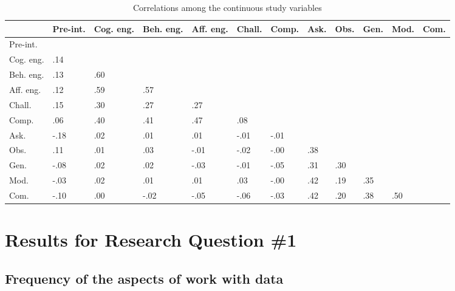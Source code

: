 \documentclass[]{msu-thesis}
\theoremstyle{definition}
\theoremstyle{definition}
\theoremstyle{definition}
\theoremstyle{remark}
\begin{document}
\begin{landscape}\begin{table}

\caption{\label{tab:unnamed-chunk-8}Correlations among the continuous study variables}
\centering
\begin{tabular}[t]{l>{\raggedright\arraybackslash}p{3em}>{\raggedright\arraybackslash}p{3em}>{\raggedright\arraybackslash}p{3em}>{\raggedright\arraybackslash}p{3em}>{\raggedright\arraybackslash}p{3em}>{\raggedright\arraybackslash}p{3em}>{\raggedright\arraybackslash}p{3em}>{\raggedright\arraybackslash}p{3em}>{\raggedright\arraybackslash}p{3em}>{\raggedright\arraybackslash}p{3em}>{\raggedright\arraybackslash}p{3em}}
\toprule
 & Pre-int. & Cog. eng. & Beh. eng. & Aff. eng. & Chall. & Comp. & Ask. & Obs. & Gen. & Mod. & Com.\\
\midrule
Pre-int. &  &  &  &  &  &  &  &  &  &  & \\
Cog. eng. & .14 &  &  &  &  &  &  &  &  &  & \\
Beh. eng. & .13 & .60 &  &  &  &  &  &  &  &  & \\
Aff. eng. & .12 & .59 & .57 &  &  &  &  &  &  &  & \\
Chall. & .15 & .30 & .27 & .27 &  &  &  &  &  &  & \\
Comp. & .06 & .40 & .41 & .47 & .08 &  &  &  &  &  & \\
Ask. & -.18 & .02 & .01 & .01 & -.01 & -.01 &  &  &  &  & \\
Obs. & .11 & .01 & .03 & -.01 & -.02 & -.00 & .38 &  &  &  & \\
Gen. & -.08 & .02 & .02 & -.03 & -.01 & -.05 & .31 & .30 &  &  & \\
Mod. & -.03 & .02 & .01 & .01 & .03 & -.00 & .42 & .19 & .35 &  & \\
Com. & -.10 & .00 & -.02 & -.05 & -.06 & -.03 & .42 & .20 & .38 & .50 & \\
\bottomrule
\end{tabular}
\end{table}
\end{landscape}

\section{Results for Research Question
\#1}\label{results-for-research-question-1}

\subsection{Frequency of the aspects of work with
data}\label{frequency-of-the-aspects-of-work-with-data}
\end{document}
